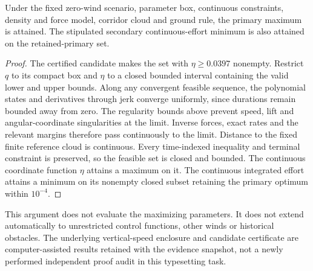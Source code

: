 \begin{proposition}
Under the fixed zero-wind scenario, parameter box, continuous constraints, density and force model, corridor cloud and ground rule, the primary maximum is attained. The stipulated secondary continuous-effort minimum is also attained on the retained-primary set.
\end{proposition}
\begin{proof}
The certified candidate makes the set with $\eta\geq0.0397$ nonempty. Restrict $q$ to its compact box and $\eta$ to a closed bounded interval containing the valid lower and upper bounds. Along any convergent feasible sequence, the polynomial states and derivatives through jerk converge uniformly, since durations remain bounded away from zero. The regularity bounds above prevent speed, lift and angular-coordinate singularities at the limit. Inverse forces, exact rates and the relevant margins therefore pass continuously to the limit. Distance to the fixed finite reference cloud is continuous. Every time-indexed inequality and terminal constraint is preserved, so the feasible set is closed and bounded. The continuous coordinate function $\eta$ attains a maximum on it. The continuous integrated effort attains a minimum on its nonempty closed subset retaining the primary optimum within $10^{-4}$.
\end{proof}
This argument does not evaluate the maximizing parameters. It does not extend automatically to unrestricted control functions, other winds or historical obstacles. The underlying vertical-speed enclosure and candidate certificate are computer-assisted results retained with the evidence snapshot, not a newly performed independent proof audit in this typesetting task.

